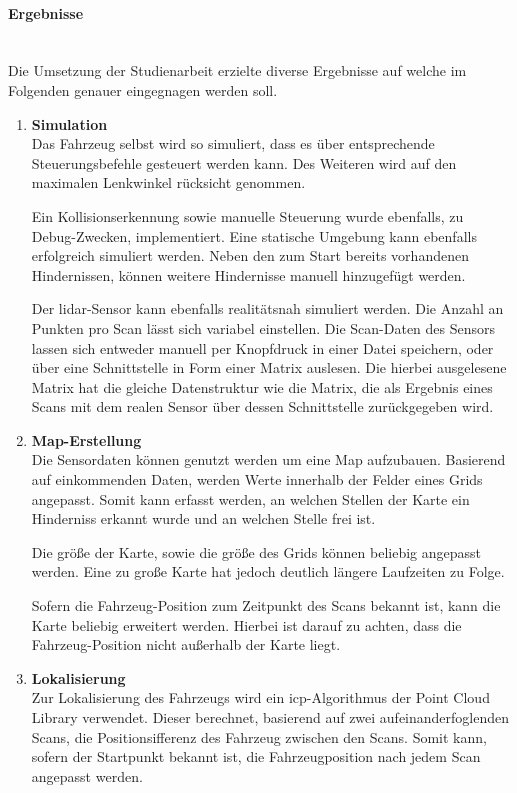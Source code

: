 \paragraph{Ergebnisse} \mbox{}\\
Die Umsetzung der Studienarbeit erzielte diverse Ergebnisse auf welche im Folgenden genauer eingegnagen werden soll.

\begin{enumerate}[leftmargin=*]
    \item \textbf{Simulation} \\
    Das Fahrzeug selbst wird so simuliert, dass es über entsprechende Steuerungsbefehle gesteuert werden kann.
    Des Weiteren wird auf den maximalen Lenkwinkel rücksicht genommen.
    
    Ein Kollisionserkennung sowie manuelle Steuerung wurde ebenfalls, zu Debug-Zwecken, implementiert.
    Eine statische Umgebung kann ebenfalls erfolgreich simuliert werden.
    Neben den zum Start bereits vorhandenen Hindernissen, können weitere Hindernisse manuell hinzugefügt werden.
    
    Der \ac{lidar}-Sensor kann ebenfalls realitätsnah simuliert werden.
    Die Anzahl an Punkten pro Scan lässt sich variabel einstellen.
    Die Scan-Daten des Sensors lassen sich entweder manuell per Knopfdruck in einer Datei speichern, 
    oder über eine Schnittstelle in Form einer Matrix auslesen.
    Die hierbei ausgelesene Matrix hat die gleiche Datenstruktur wie die Matrix, 
    die als Ergebnis eines Scans mit dem realen Sensor über dessen Schnittstelle zurückgegeben wird.

    \item \textbf{Map-Erstellung} \\
    Die Sensordaten können genutzt werden um eine Map aufzubauen.
    Basierend auf einkommenden Daten, werden Werte innerhalb der Felder eines Grids angepasst.
    Somit kann erfasst werden, an welchen Stellen der Karte ein Hinderniss erkannt wurde und an welchen Stelle frei ist.
    
    Die größe der Karte, sowie die größe des Grids können beliebig angepasst werden.
    Eine zu große Karte hat jedoch deutlich längere Laufzeiten zu Folge.

    Sofern die Fahrzeug-Position zum Zeitpunkt des Scans bekannt ist, kann die Karte beliebig erweitert werden.
    Hierbei ist darauf zu achten, dass die Fahrzeug-Position nicht außerhalb der Karte liegt.

    \item \textbf{Lokalisierung} \\
    Zur Lokalisierung des Fahrzeugs wird ein \ac{icp}-Algorithmus der Point Cloud Library verwendet.
    Dieser berechnet, basierend auf zwei aufeinanderfoglenden Scans, die Positionsifferenz des Fahrzeug zwischen den Scans.
    Somit kann, sofern der Startpunkt bekannt ist, die Fahrzeugposition nach jedem Scan angepasst werden.


\end{enumerate}
